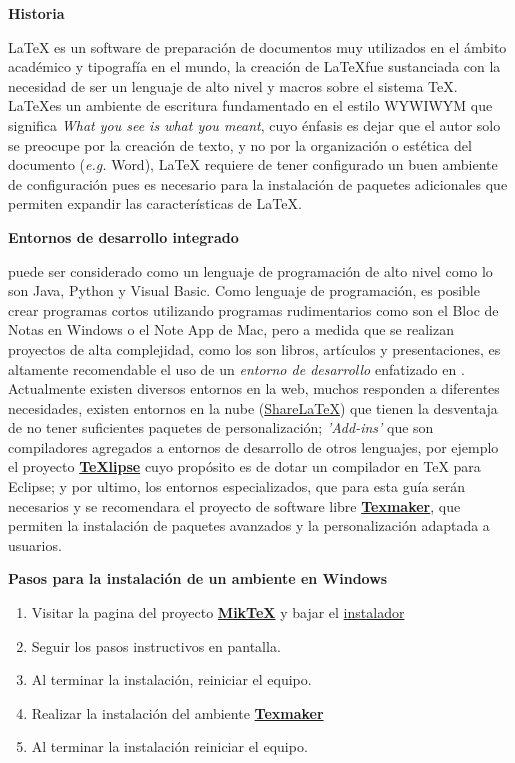 \textbf{Historia}

 \LaTeX{} es un software de preparación de documentos muy utilizados en el ámbito académico y tipografía en el mundo, la creación de \LaTeX fue sustanciada con la necesidad de ser un lenguaje de alto nivel y macros sobre el sistema \TeX. \LaTeX  es un ambiente de escritura fundamentado en el estilo WYWIWYM que significa \emph{What you see is what you meant}, cuyo énfasis es dejar que el autor solo se preocupe por la creación de texto, y no por la organización o estética del documento (\emph{e.g.} Word), \LaTeX{} requiere de tener configurado un buen ambiente de configuración pues es necesario para la instalación de paquetes adicionales que permiten expandir las características de \LaTeX. 
 
 \textbf{Entornos de desarrollo integrado}
 
\LaTeXe{}   puede ser considerado como un lenguaje de programación de alto nivel como lo son Java, Python y Visual Basic. Como lenguaje de programación, es posible crear programas cortos utilizando programas rudimentarios como son el Bloc de Notas en Windows o el Note App de Mac, pero a medida que se realizan proyectos de alta complejidad, como los son libros, artículos y presentaciones, es altamente recomendable el uso de un \emph{entorno de desarrollo } enfatizado en \LaTeXe. Actualmente existen diversos entornos en la web, muchos responden a diferentes necesidades, existen entornos en la nube (\href{https://www.sharelatex.com}{ShareLaTeX}) que tienen la desventaja de no tener suficientes paquetes de personalización; \emph{'Add-ins'} que son compiladores agregados a entornos de desarrollo de otros lenguajes, por ejemplo el proyecto \href{texlipse.sourceforge.net}{\textbf{TeXlipse}} cuyo propósito es de dotar un compilador en \TeX{} para Eclipse; y por ultimo, los entornos especializados, que para esta guía serán necesarios y se recomendara el proyecto de software libre \href{www.xm1math.net/texmaker/}{\textbf{Texmaker}}, que permiten la instalación de paquetes avanzados y la personalización adaptada a usuarios.

\textbf{Pasos para la instalación de un ambiente en Windows}

\begin{enumerate}
	\item Visitar la pagina del proyecto \href{http://miktex.org/download}{ \textbf{ Mik\TeX{}}} y bajar el    \href{http://mirrors.ctan.org/systems/win32/miktex/setup/basic-miktex-2.9.5105.exe}{instalador}	
	\item Seguir los pasos instructivos en pantalla.
	\item Al terminar la instalación, reiniciar el equipo.
	\item  Realizar la instalación del ambiente \href{www.xm1math.net/texmaker/}{\textbf{Texmaker}}
	\item Al terminar la instalación reiniciar el equipo.
\end{enumerate}


